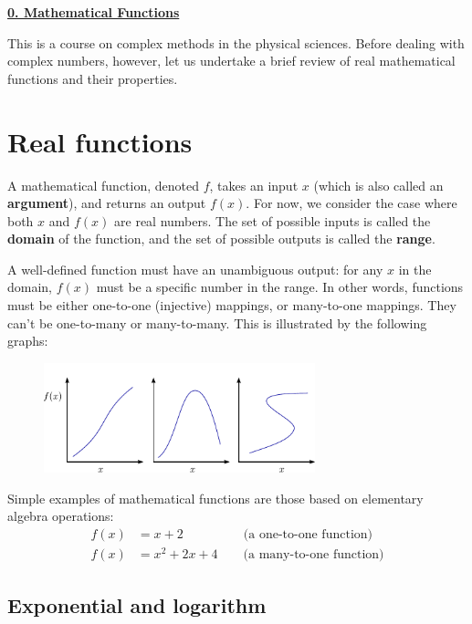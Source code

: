 \documentclass[10pt,a4paper]{article}
\begin{document}
\noindent
\underline{\textbf{\LARGE 0. Mathematical Functions}}
\vskip 0.1in

This is a course on complex methods in the physical sciences. Before
dealing with complex numbers, however, let us undertake a brief review
of real mathematical functions and their properties.

\section{Real functions}\label{real-functions}

A mathematical function, denoted $f$, takes an input $x$ (which is
also called an \textbf{argument}), and returns an output $f(x)$. For
now, we consider the case where both $x$ and $f(x)$ are real
numbers. The set of possible inputs is called the \textbf{domain} of the
function, and the set of possible outputs is called the \textbf{range}.

A well-defined function must have an unambiguous output: for any $x$
in the domain, $f(x)$ must be a specific number in the range. In other
words, functions must be either one-to-one (injective) mappings, or
many-to-one mappings. They can't be one-to-many or many-to-many. This is
illustrated by the following graphs:

\begin{figure}[h]
  \centering\includegraphics[width=0.7\textwidth]{mathfunctions}
\end{figure}

\noindent
Simple examples of mathematical functions are those based on elementary
algebra operations:
\begin{align*}
  f(x) &= x + 2 \,\;\;\qquad\qquad \text{(a one-to-one function)} \\
  f(x) &= x^2 + 2x + 4 \qquad \text{(a many-to-one function)}
\end{align*}

\subsection{Exponential and logarithm}
\label{Exponentials}
\end{document}
